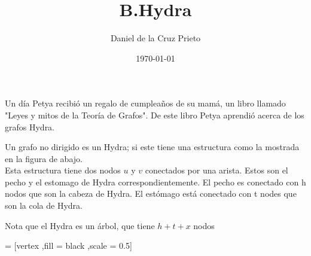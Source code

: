 \documentclass{article}
\begin{document}
    \title{B.Hydra} 
    \author{Daniel de la Cruz Prieto} 
    \date{\today} 
    \maketitle

    \begin{flushleft}
    	Un d\'ia Petya recibi\'o un regalo de cumplea\~nos de su mam\'a, un libro llamado "Leyes y mitos de la Teor\'ia de Grafos". De este libro Petya aprendi\'o acerca de los grafos Hydra.
    \end{flushleft}
    
    \begin{flushleft}
        Un grafo no dirigido es un Hydra; si este tiene una estructura como la mostrada en la figura de abajo.\\
        Esta estructura tiene dos nodos $u$ y $v$ conectados por una arista. Estos son el pecho y el estomago de Hydra
        correspondientemente. El pecho es conectado con h nodos que son la cabeza de Hydra. El est\'omago est\'a conectado con t nodes que son la cola de Hydra.
    \end{flushleft}
      
    \begin{flushleft}
         Nota que el Hydra es un \'arbol, que tiene $h+t+x$ nodos
    \end{flushleft}
    
    \begin{center}
         = [vertex ,fill = black ,scale = 0.5]
    \end{center}
\end{document}
